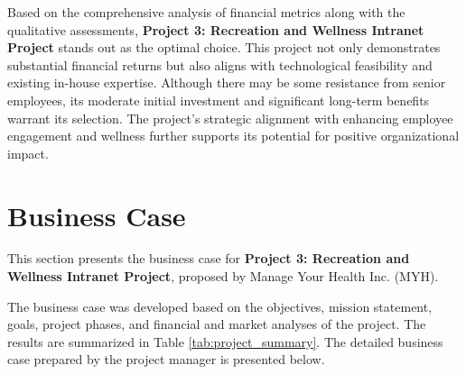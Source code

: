 Based on the comprehensive analysis of financial metrics along with the qualitative assessments, \textbf{Project 3: Recreation and Wellness Intranet Project} stands out as the optimal choice. This project not only demonstrates substantial financial returns but also aligns with technological feasibility and existing in-house expertise. Although there may be some resistance from senior employees, its moderate initial investment and significant long-term benefits warrant its selection. The project's strategic alignment with enhancing employee engagement and wellness further supports its potential for positive organizational impact.


\section{Business Case}
This section presents the business case for \textbf{Project 3: Recreation and Wellness Intranet Project}, proposed by Manage Your Health Inc. (MYH). 

The business case was developed based on the objectives, mission statement, goals, project phases, and financial and market analyses of the project. The results are summarized in Table \ref{tab:project_summary}. The detailed business case prepared by the project manager is presented below.


